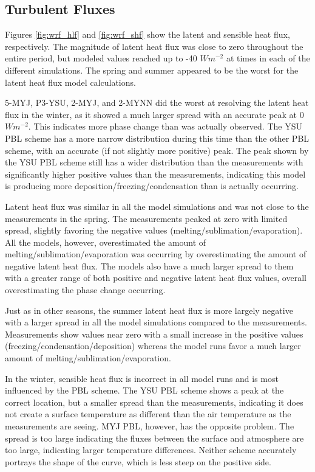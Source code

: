 \subsection{Turbulent Fluxes}
Figures \ref{fig:wrf_hlf} and \ref{fig:wrf_shf} show the latent and sensible heat flux, respectively. The magnitude of latent heat flux was close to zero throughout the entire period, but modeled values reached up to -40 $Wm^{-2}$   at times in each of the different simulations. The spring and summer appeared to be the worst for the latent heat flux model calculations. 

5-MYJ, P3-YSU, 2-MYJ, and 2-MYNN did the worst at resolving the latent heat flux in the winter, as it showed a much larger spread with an accurate peak at 0 $Wm^{-2}$. This indicates more phase change than was actually observed. The YSU PBL scheme has a more narrow distribution during this time than the other PBL scheme, with an accurate (if not slightly more positive) peak. The peak shown by the YSU PBL scheme still has a wider distribution than the measurements with significantly higher positive values than the measurements, indicating this model is producing more deposition/freezing/condensation than is actually occurring.

Latent heat flux was similar in all the model simulations and was not close to the measurements in the spring. The measurements peaked at zero with limited spread, slightly favoring the negative values (melting/sublimation/evaporation). All the models, however, overestimated the amount of melting/sublimation/evaporation was occurring by overestimating the amount of negative latent heat flux. The models also have a much larger spread to them with a greater range of both positive and negative latent heat flux values, overall overestimating the phase change occurring.

Just as in other seasons, the summer latent heat flux is more largely negative with a larger spread in all the model simulations compared to the measurements. Measurements show values near zero with a small increase in the positive values (freezing/condensation/deposition) whereas the model runs favor a much larger amount of melting/sublimation/evaporation.

In the winter, sensible heat flux is incorrect in all model runs and is most influenced by the PBL scheme. The YSU PBL scheme shows a peak at the correct location, but a smaller spread than the measurements, indicating it does not create a surface temperature as different than the air temperature as the measurements are seeing. MYJ PBL, however, has the opposite problem. The spread is too large indicating the fluxes between the surface and atmosphere are too large, indicating larger temperature differences. Neither scheme accurately portrays the shape of the curve, which is less steep on the positive side.

